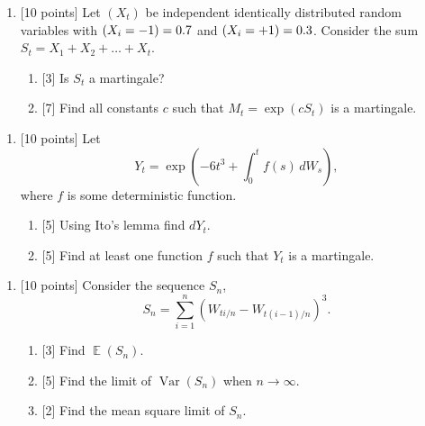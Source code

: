 \documentclass[12pt]{article} %
\theoremstyle{definition} %
\DeclareMathOperator{\Var}{Var}
\DeclareMathOperator{\E}{\mathbb{E}}
\let\P\relax
\DeclareMathOperator{\P}{\mathbb{P}}
\newcommand \putyourname{\fbox{
    \begin{minipage}{42em}
      Name, group no:\vspace*{3ex}\par
      \noindent\dotfill\vspace{2mm}
    \end{minipage}
  }
}
\begin{document}

\begin{enumerate}
    \item {[10 points]} Let $(X_t)$ be independent identically distributed random variables 
    with $\P(X_i = -1) = 0.7$ and $\P(X_i = +1) = 0.3$. Consider the sum $S_t = X_1 + X_2 + \ldots + X_t$.
 \begin{enumerate}
    \item {[3]} Is $S_t$ a martingale?
    \item {[7]} Find all constants $c$ such that $M_t = \exp(cS_t)$ is a martingale. 
 \end{enumerate}

\end{enumerate}


\begin{enumerate}[resume]
\item {[10 points]} Let
    \[
    Y_t = \exp \left(-6t^3 + \int_0^t f(s)\, dW_s \right),
    \]
where $f$ is some deterministic function.
    
\begin{enumerate}
\item {[5]} Using Ito's lemma find $dY_t$.
\item {[5]} Find at least one function $f$ such that $Y_t$ is a martingale.
\end{enumerate}
    
\end{enumerate}


\begin{enumerate}[resume]
    \item {[10 points]} Consider the sequence $S_n$,
    \[
    S_n =  \sum_{i=1}^n (W_{ti/n} - W_{t(i-1)/n})^3.  
    \]
    \begin{enumerate}
    \item {[3]} Find $\E(S_n)$.
    \item {[5]} Find the limit of $\Var(S_n)$ when $n \to \infty$.
    \item {[2]} Find the mean square limit of $S_n$. 
\end{enumerate}

\end{enumerate}
 
\end{document}
